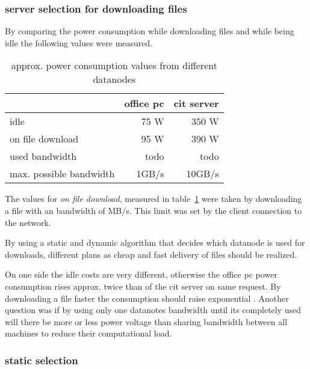 \subsubsection{server selection for downloading files}

By comparing the power consumption while downloading files and while being idle the following values were measured.

\begin{table}
	\centering
	\begin{tabular}{|l|r|r|}
		\hline  & office pc & cit server \\ 
		\hline idle &   75 W &   350 W \\ 
		\hline on file download &   95 W &   390 W \\ 
		\hline used bandwidth & todo & todo \\
		\hline max. possible bandwidth & 1GB/s & 10GB/s \\
		\hline
	\end{tabular}\newline
	\caption{approx. power consumption values from different datanodes}
	\label{tab:powerconsumptionvalues}
\end{table}

The values for \textit{on file download}, measured in table~\ref{tab:powerconsumptionvalues} were taken by downloading a file with an bandwidth of  MB/s. This limit was set by the client connection to the network.

By using a static and dynamic algorithm that decides which datanode is used for downloads, different plans as cheap and fast delivery of files should be realized.

On one side the idle costs are very different, otherwise the office pc power consumption rises approx. twice than of the cit server on same request. By downloading a file faster the consumption should raise exponential . Another question was if by using only one datanotes bandwidth until its completely used will there be more or less power voltage than sharing bandwidth between all machines to reduce their computational load. 

\subsubsection{static selection}

